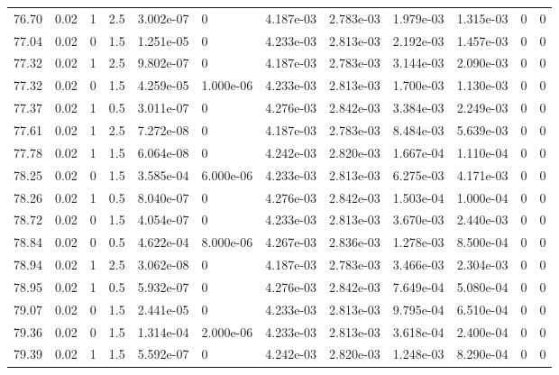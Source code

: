 \documentclass[preview]{standalone}
\begin{document}
{{{{{{{{{{{\begin{tabular}{L{1.2cm}C{1.2cm} C{0.3cm}C{0.5cm} C{1.4cm}C{1.4cm} C{1.4cm}C{1.4cm} C{1.6cm}C{1.6cm} C{1.6cm}C{1.6cm}}
  76.70  &  0.02  & 1     & 2.5 &  3.002e-07  & 0  &  4.187e-03&   2.783e-03& 1.979e-03 & 1.315e-03   &  0 & 0  \\ 
  77.04  &  0.02  & 0     & 1.5 &  1.251e-05  & 0  &  4.233e-03&   2.813e-03& 2.192e-03 & 1.457e-03   &  0 & 0  \\ 
  77.32  &  0.02  & 1     & 2.5 &  9.802e-07  & 0  &  4.187e-03&   2.783e-03& 3.144e-03 & 2.090e-03   &  0 & 0  \\ 
  77.32  &  0.02  & 0     & 1.5 &  4.259e-05  & 1.000e-06  &  4.233e-03&   2.813e-03& 1.700e-03 & 1.130e-03   &  0 & 0  \\ 
  77.37  &  0.02  & 1     & 0.5 &  3.011e-07  & 0  &  4.276e-03&   2.842e-03& 3.384e-03 & 2.249e-03   &  0 & 0  \\ 
  77.61  &  0.02  & 1     & 2.5 &  7.272e-08  & 0  &  4.187e-03&   2.783e-03& 8.484e-03 & 5.639e-03   &  0 & 0  \\ 
  77.78  &  0.02  & 1     & 1.5 &  6.064e-08  & 0  &  4.242e-03&   2.820e-03& 1.667e-04 & 1.110e-04   &  0 & 0  \\ 
  78.25  &  0.02  & 0     & 1.5 &  3.585e-04  & 6.000e-06  &  4.233e-03&   2.813e-03& 6.275e-03 & 4.171e-03   &  0 & 0  \\ 
  78.26  &  0.02  & 1     & 0.5 &  8.040e-07  & 0  &  4.276e-03&   2.842e-03& 1.503e-04 & 1.000e-04   &  0 & 0  \\ 
  78.72  &  0.02  & 0     & 1.5 &  4.054e-07  & 0  &  4.233e-03&   2.813e-03& 3.670e-03 & 2.440e-03   &  0 & 0  \\ 
  78.84  &  0.02  & 0     & 0.5 &  4.622e-04  & 8.000e-06  &  4.267e-03&   2.836e-03& 1.278e-03 & 8.500e-04   &  0 & 0  \\ 
  78.94  &  0.02  & 1     & 2.5 &  3.062e-08  & 0  &  4.187e-03&   2.783e-03& 3.466e-03 & 2.304e-03   &  0 & 0  \\ 
  78.95  &  0.02  & 1     & 0.5 &  5.932e-07  & 0  &  4.276e-03&   2.842e-03& 7.649e-04 & 5.080e-04   &  0 & 0  \\ 
  79.07  &  0.02  & 0     & 1.5 &  2.441e-05  & 0  &  4.233e-03&   2.813e-03& 9.795e-04 & 6.510e-04   &  0 & 0  \\ 
  79.36  &  0.02  & 0     & 1.5 &  1.314e-04  & 2.000e-06  &  4.233e-03&   2.813e-03& 3.618e-04 & 2.400e-04   &  0 & 0  \\ 
  79.39  &  0.02  & 1     & 1.5 &  5.592e-07  & 0  &  4.242e-03&   2.820e-03& 1.248e-03 & 8.290e-04   &  0 & 0  \\ 
\hline 
\end{tabular} 

}}}}}}}}}}}
\end{document}
